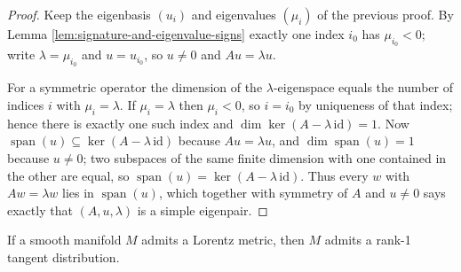 \begin{proof}
\leanok
{}
Keep the eigenbasis $(u_i)$ and eigenvalues $(\mu_i)$ of the previous proof. By Lemma \ref{lem:signature-and-eigenvalue-signs} exactly one index $i_0$ has $\mu_{i_0} < 0$; write $\lambda = \mu_{i_0}$ and $u = u_{i_0}$, so $u \neq 0$ and $Au = \lambda u$.

For a symmetric operator the dimension of the $\lambda$-eigenspace equals the number of indices $i$ with $\mu_i = \lambda$. If $\mu_i = \lambda$ then $\mu_i < 0$, so $i = i_0$ by uniqueness of that index; hence there is exactly one such index and $\dim\ker(A - \lambda\,\mathrm{id}) = 1$. Now $\operatorname{span}(u) \subseteq \ker(A-\lambda\,\mathrm{id})$ because $Au = \lambda u$, and $\dim\operatorname{span}(u) = 1$ because $u \neq 0$; two subspaces of the same finite dimension with one contained in the other are equal, so $\operatorname{span}(u) = \ker(A - \lambda\,\mathrm{id})$. Thus every $w$ with $Aw = \lambda w$ lies in $\operatorname{span}(u)$, which together with symmetry of $A$ and $u \neq 0$ says exactly that $(A,u,\lambda)$ is a simple eigenpair.
\end{proof}

\begin{proposition}
\label{prop:rank-one-distribution-of-lorentz-metric}
\leanok
{}
If a smooth manifold $M$ admits a Lorentz metric, then $M$ admits a rank-1 tangent distribution.
\end{proposition}

